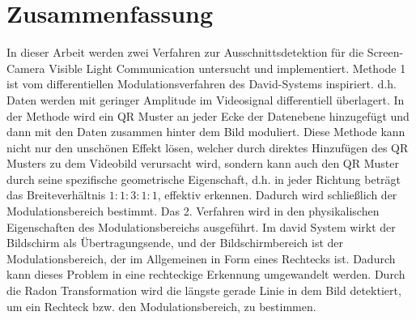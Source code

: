 \chapter{Zusammenfassung} \label{cha:Zusammenfassung}

In dieser Arbeit werden zwei Verfahren zur Ausschnittsdetektion für die Screen-Camera Visible Light Communication untersucht und implementiert. Methode 1 ist vom differentiellen Modulationsverfahren des David-Systems inspiriert. d.h. Daten werden mit geringer Amplitude im Videosignal differentiell überlagert. In der Methode wird ein QR Muster an jeder Ecke der Datenebene hinzugefügt und dann mit den Daten zusammen hinter dem Bild moduliert. Diese Methode kann nicht nur den unschönen Effekt lösen, welcher durch direktes Hinzufügen des QR Musters zu dem Videobild verursacht wird, sondern kann auch den QR Muster durch seine spezifische geometrische Eigenschaft, d.h. in jeder Richtung beträgt das Breiteverhältnis $1:1:3:1:1$, effektiv erkennen. Dadurch wird schließlich der Modulationsbereich bestimmt. Das 2. Verfahren wird in den physikalischen Eigenschaften des Modulationsbereichs ausgeführt. Im \gls{david} System wirkt der Bildschirm als Übertragungsende, und der Bildschirmbereich ist der Modulationsbereich, der im Allgemeinen in Form eines Rechtecks ist. Dadurch kann dieses Problem in eine rechteckige Erkennung umgewandelt werden. Durch die Radon Transformation wird die längste gerade Linie in dem Bild detektiert, um ein Rechteck bzw. den Modulationsbereich, zu bestimmen.

